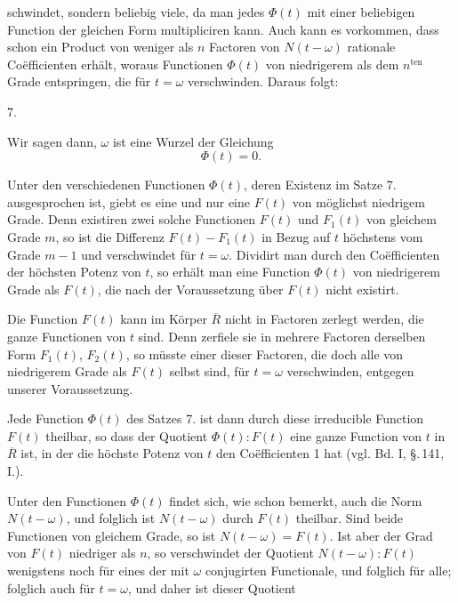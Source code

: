 schwindet, sondern beliebig viele, da man jedes $\Phi(t)$ mit einer
beliebigen Function der gleichen Form multipliciren kann. Auch
kann es vorkommen, dass schon ein Product von weniger als
$n$ Factoren von $N(t-\omega)$ rationale Co\"efficienten erhält, woraus
Functionen $\Phi(t)$ von niedrigerem als dem $n^{\text{ten}}$ Grade entspringen,
die für $t = \omega$ verschwinden. Daraus folgt:

7. 

Wir sagen dann, $\omega$ ist eine Wurzel der Gleichung
\[
\Phi(t) = 0.
\]

Unter den verschiedenen Functionen $\Phi(t)$, deren Existenz
im Satze 7. ausgesprochen ist, giebt es eine und nur eine $F(t)$
von möglichst niedrigem Grade. Denn existiren zwei solche
Functionen $F(t)$ und $F_1(t)$ von gleichem Grade $m$, so ist die
Differenz $F(t) - F_1(t)$ in Bezug auf $t$ höchstens vom Grade
$m - 1$ und verschwindet für $t = \omega$. Dividirt man durch den
Co\"efficienten der höchsten Potenz von $t$, so erhält man eine
Function $\Phi(t)$ von niedrigerem Grade als $F(t)$, die nach der
Voraussetzung über $F(t)$ nicht existirt.

Die Function $F(t)$ kann im Körper $\overline{R}$ nicht in Factoren
zerlegt werden, die ganze Functionen von $t$ sind. Denn zerfiele
sie in mehrere Factoren derselben Form $F_1(t)$, $F_2(t)$, so müsste
einer dieser Factoren, die doch alle von niedrigerem Grade als
$F(t)$ selbst sind, für $t = \omega$ verschwinden, entgegen unserer
Voraussetzung.

Jede Function $\Phi(t)$ des Satzes 7. ist dann durch diese
irreducible Function $F(t)$ theilbar, so dass der Quotient
$\Phi(t):F(t)$ eine ganze Function von $t$ in $\overline{R}$ ist, in der die
höchste Potenz von $t$ den Co\"efficienten 1 hat (vgl. Bd. I,
\S.\,141, I.).

Unter den Functionen $\Phi(t)$ findet sich, wie schon bemerkt,
auch die Norm $N(t-\omega)$, und folglich ist $N(t-\omega)$ durch $F(t)$
theilbar. Sind beide Functionen von gleichem Grade, so ist
$N(t-\omega) = F(t)$. Ist aber der Grad von $F(t)$ niedriger als $n$,
so verschwindet der Quotient $N(t-\omega):F(t)$ wenigstens noch
für eines der mit $\omega$ conjugirten Functionale, und folglich für
alle; folglich auch für $t = \omega$, und daher ist dieser Quotient
